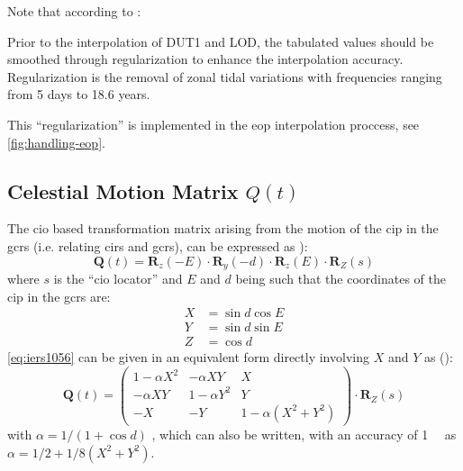 Note that according to \cite{Bradley2016850}:
\begin{displayquote}
    Prior to the interpolation of DUT1 and LOD, the tabulated values
    should be smoothed through regularization to enhance the
    interpolation accuracy. Regularization is the removal of
    zonal tidal variations with frequencies ranging from 5 days
    to 18.6 years.
\end{displayquote}
This ``regularization'' is implemented in the \gls{eop} interpolation proccess, 
see \ref{fig:handling-eop}.

\subsection{Celestial Motion Matrix $Q(t)$}
\label{ssec:celestial-motion-matrix}
The \gls{cio} based transformation matrix arising from the motion of the \gls{cip} 
in the \gls{gcrs} (i.e. relating \gls{cirs} and \gls{gcrs}), can be expressed as
\cite{iers2010}):
\begin{equation}
  \bm{Q}(t) = \bm{R}_z (-E)  \cdot 
              \bm{R}_y (-d) \cdot 
              \bm{R}_z (E) \cdot 
              \bm{R}_Z (s)
  \label{eq:iers1056}
\end{equation}
where $s$ is the ``\gls{cio} locator'' and $E$ and $d$ being such that the 
coordinates of the \gls{cip} in the \gls{gcrs} are:
\begin{equation}
  \begin{aligned}
    X & = \sin{d} \cos{E} \\
    Y & = \sin{d} \sin{E} \\
    Z & = \cos{d}
  \end{aligned}
\end{equation}
\ref{eq:iers1056} can be given in an equivalent form directly involving $X$ and 
$Y$ as (\cite{iers2010}):
\begin{equation}
  \bm{Q}(t) = \begin{pmatrix}
    1-\alpha X^2 & -\alpha XY & X \\
    -\alpha XY & 1-\alpha Y^2 & Y \\
    -X & -Y & 1-\alpha (X^2 + Y^2) \end{pmatrix}
    \cdot \bm{R}_Z (s)
    \label{eq:iers10510}
\end{equation}
with $\alpha = 1/(1+\cos{d})$ , which can also be written, with an accuracy of 
\SI{1}{\micro\larcsecond} as $\alpha = 1/2 + 1/8(X^2 + Y^2)$.

